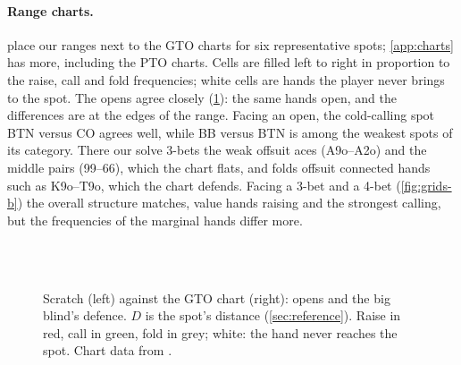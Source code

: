 \begin{table}[ht]
\centering\footnotesize\setlength{\tabcolsep}{4pt}
\caption{Sanity metrics of the shipped Scratch solve, with the GTO charts' values in grey: open frequency per seat, the big blind's response to that open, and the opener's response to a big blind 3-bet. Each is a percentage of the actor's range at the spot: every class weighted by its combinations and by the probability that the actor's own earlier actions bring it there (card removal ignored). Facing an open, the big blind has not acted, so these are percentages of all \num{1326} combos.}
\label{tab:sanity}
\end{table}

\paragraph{Range charts.}  place our ranges next to the GTO charts for six representative spots; \cref{app:charts} has more, including the PTO charts. Cells are filled left to right in proportion to the raise, call and fold frequencies; white cells are hands the player never brings to the spot. The opens agree closely (\cref{fig:grids-a}): the same hands open, and the differences are at the edges of the range. Facing an open, the cold-calling spot BTN versus CO agrees well, while BB versus BTN is among the weakest spots of its category. There our solve 3-bets the weak offsuit aces (A9o--A2o) and the middle pairs (99--66), which the chart flats, and folds offsuit connected hands such as K9o--T9o, which the chart defends. Facing a 3-bet and a 4-bet (\cref{fig:grids-b}) the overall structure matches, value hands raising and the strongest calling, but the frequencies of the marginal hands differ more.

\begin{figure}[p]
\centering
{}\\[3mm]
\\[3mm]
\caption{Scratch (left) against the GTO chart (right): opens and the big blind's defence. $D$ is the spot's distance (\cref{sec:reference}). Raise in red, call in green, fold in grey; white: the hand never reaches the spot. Chart data from \textcite{pokertrainer}.}
\label{fig:grids-a}
\end{figure}

